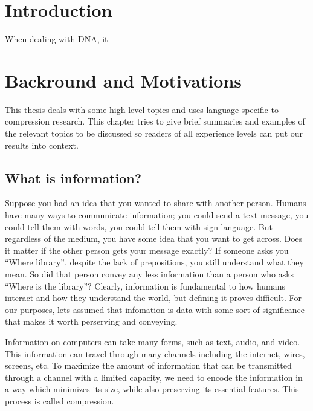 \documentclass[12pt,twoside]{reedthesis}
\begin{document}
\hypertarget{introduction}{%
\chapter*{Introduction}\label{introduction}}

When dealing with DNA, it

\hypertarget{backround-and-motivations}{%
\chapter{Backround and Motivations}\label{backround-and-motivations}}

This thesis deals with some high-level topics and uses language specific to compression research. This chapter tries to give brief summaries and examples of the relevant topics to be discussed so readers of all experience levels can put our results into context.

\hypertarget{what-is-information}{%
\section{What is information?}\label{what-is-information}}

Suppose you had an idea that you wanted to share with another person. Humans have many ways to communicate information; you could send a text message, you could tell them with words, you could tell them with sign language. But regardless of the medium, you have some idea that you want to get across. Does it matter if the other person gets your message exactly? If someone asks you ``Where library'', despite the lack of prepositions, you still understand what they mean. So did that person convey any less information than a person who asks ``Where is the library''?
Clearly, information is fundamental to how humans interact and how they understand the world, but defining it proves difficult. For our purposes, lets assumed that infomation is data with some sort of significance that makes it worth perserving and conveying.

Information on computers can take many forms, such as text, audio, and video. This information can travel through many channels including the internet, wires, screens, etc. To maximize the amount of information that can be transmitted through a channel with a limited capacity, we need to encode the information in a way which minimizes its size, while also preserving its essential features. This process is called compression.
\end{document}
